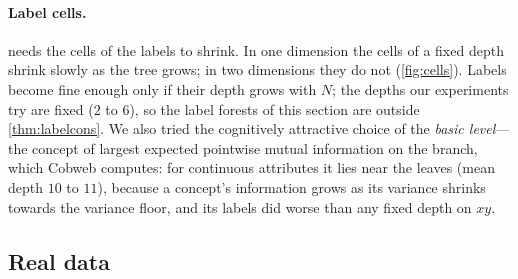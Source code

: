 \documentclass[11pt]{article}
\theoremstyle{definition}
\theoremstyle{remark}
\begin{document}
\paragraph{Label cells.}
 needs the cells of the labels to shrink.  In one dimension the cells
of a fixed depth shrink slowly as the tree grows; in two dimensions they do not
(\cref{fig:cells}).  Labels become fine enough only if their depth grows with $N$; the
depths our experiments try are fixed ($2$ to $6$), so the label forests of this section
are outside \cref{thm:labelcons}.  We also tried the cognitively attractive choice of the
\emph{basic level}---the concept of largest expected pointwise mutual information on the
branch, which Cobweb computes: for continuous attributes it lies near the leaves (mean
depth $10$ to $11$), because a concept's information grows as its variance shrinks
towards the variance floor, and its labels did worse than any fixed depth on $xy$.

\subsection{Real data}

\begin{table}[t]
\centering\small
\resizebox{\linewidth}{!}{}
\caption{Feynman equations, $N=4000$: test RMSE$/\mathrm{sd}(f)$, mean of three seeds;
forests use a balanced graph over the inputs in their listed order.}
\label{tab:feynman}
\end{table}

\begin{table}[t]
\centering\small
\resizebox{\linewidth}{!}{}
\caption{California housing: test RMSE of the log median value (three seeds).}
\label{tab:housing}
\end{table}

\begin{table}[t]
\centering\small

\caption{MNIST, accuracy (\%, three seeds).  Forests have one tree per $7\times7$
patch.  ``label'': the patch trees categorize (the Convolutional-Cobweb protocol);
``cross'': they predict the centre pixels of the neighbouring patches; ``act'': they
predict the class and pass its distribution; ``hybrid'': ``act'' plus labels.}
\label{tab:mnist}
\end{table}

\begin{table}[t]
\centering\small

\caption{Next word on OpenWebText from the previous four words (2000-word vocabulary):
top-1 accuracy (\%) / cross-entropy (nats).  An accuracy of 20.9 is the frequency of the
unknown-word token.}
\label{tab:owt}
\end{table}
\end{document}
